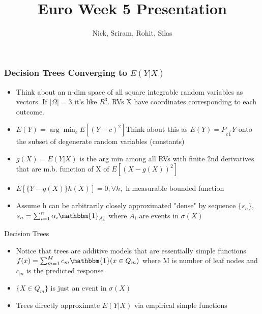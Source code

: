 \documentclass{beamer}
\title{Euro Week 5 Presentation}
\author{Nick, Sriram, Rohit, Silas}
\begin{document}
    \maketitle
    \begin{frame}
        \frametitle{Decision Trees Converging to $E(Y|X)$}

        \begin{itemize}
            \item Think about an n-dim space of all square integrable random variables as vectors. If $|\Omega| = 3$ it's like $R^3$. RVs X have coordinates corresponding to each outcome. 

            \item $E(Y) = \arg \min_c E[(Y - c)^2]$Think about this as $E(Y) = P_{c \vec{1}} Y$ onto the subset of degenerate random variables (constants)
        
            \item $g(X) = E(Y|X)$ is the arg min among all RVs with finite 2nd derivatives that are m.b. function of X of $E[(X-g(X))^2]$ 
            
            \item $E[\{Y - g(X)\}h(X)] = 0, \forall h,$ h measurable bounded function

            \item Assume h can be arbitrarily closely approximated "dense" by sequence $\{s_n\}$, $s_n = \sum_{i=1}^n \alpha_i \mathbbm{1}_{A_i}$ where $A_i$ are events in $\sigma(X)$
        \end{itemize}

        Decision Trees
        \begin{itemize}
            \item Notice that trees are additive models that are essentially simple functions $f(x) = \sum_{m=1}^M c_m \mathbbm{1} (x \in Q_m) $ where M is number of leaf nodes and $c_m $ is the predicted response 

            \item $\{X \in Q_m\}$ is just an event in $\sigma(X)$

            \item Trees directly approximate $E(Y|X)$ via empirical simple functions
        \end{itemize}
    \end{frame}
\end{document}
